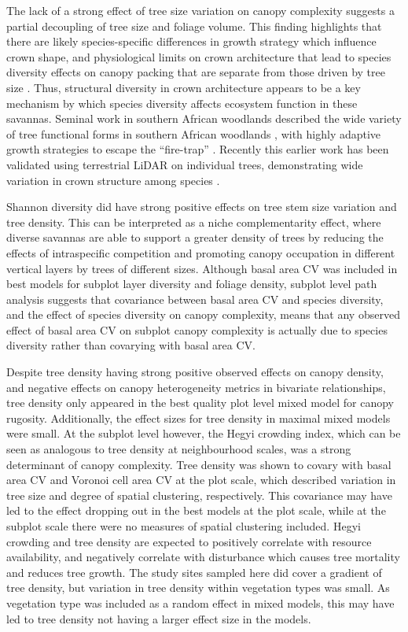\begin{refsection}
The lack of a strong effect of tree size variation on canopy complexity suggests a partial decoupling of tree size and foliage volume. This finding highlights that there are likely species-specific differences in growth strategy which influence crown shape, and physiological limits on crown architecture that lead to species diversity effects on canopy packing that are separate from those driven by tree size \citep{Panzou2020}. Thus, structural diversity in crown architecture appears to be a key mechanism by which species diversity affects ecosystem function in these savannas. Seminal work in southern African woodlands described the wide variety of tree functional forms in southern African woodlands \citep{Solbrig1996}, with highly adaptive growth strategies to escape the ``fire-trap'' \citep{Dantas2013}. Recently this earlier work has been validated using terrestrial LiDAR on individual trees, demonstrating wide variation in crown structure among species \citep{Luck2020}.

Shannon diversity did have strong positive effects on tree stem size variation and tree density. This can be interpreted as a niche complementarity effect, where diverse savannas are able to support a greater density of trees by reducing the effects of intraspecific competition and promoting canopy occupation in different vertical layers by trees of different sizes. Although basal area CV was included in best models for subplot layer diversity and foliage density, subplot level path analysis suggests that covariance between basal area CV and species diversity, and the effect of species diversity on canopy complexity, means that any observed effect of basal area CV on subplot canopy complexity is actually due to species diversity rather than covarying with basal area CV. 

Despite tree density having strong positive observed effects on canopy density, and negative effects on canopy heterogeneity metrics in bivariate relationships, tree density only appeared in the best quality plot level mixed model for canopy rugosity. Additionally, the effect sizes for tree density in maximal mixed models were small. At the subplot level however, the Hegyi crowding index, which can be seen as analogous to tree density at neighbourhood scales, was a strong determinant of canopy complexity. Tree density was shown to covary with basal area CV and Voronoi cell area CV at the plot scale, which described variation in tree size and degree of spatial clustering, respectively. This covariance may have led to the effect dropping out in the best models at the plot scale, while at the subplot scale there were no measures of spatial clustering included. Hegyi crowding and tree density are expected to positively correlate with resource availability, and negatively correlate with disturbance which causes tree mortality and reduces tree growth. The study sites sampled here did cover a gradient of tree density, but variation in tree density within vegetation types was small. As vegetation type was included as a random effect in mixed models, this may have led to tree density not having a larger effect size in the models.


\end{refsection}
